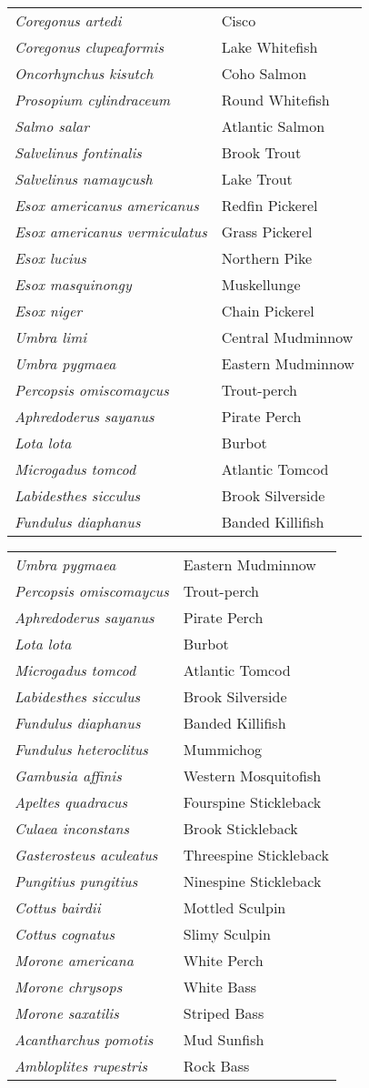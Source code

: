\documentclass[11pt]{article}
\begin{document}
\vspace{\baselineskip}

%
\textbf{\Student}

\begin{tabular}{@{}L{3in}L{3in}@{}}
\textit{Coregonus artedi} & Cisco\tabularnewline
\textit{Coregonus clupeaformis} & Lake Whitefish\tabularnewline
\textit{Oncorhynchus kisutch} & Coho Salmon\tabularnewline
\textit{Prosopium cylindraceum} & Round Whitefish\tabularnewline
\textit{Salmo salar} & Atlantic Salmon\tabularnewline
\textit{Salvelinus fontinalis} & Brook Trout\tabularnewline
\textit{Salvelinus namaycush} & Lake Trout\tabularnewline
\textit{Esox americanus americanus} & Redfin Pickerel\tabularnewline
\textit{Esox americanus vermiculatus} & Grass Pickerel\tabularnewline
\textit{Esox lucius} & Northern Pike\tabularnewline
\textit{Esox masquinongy} & Muskellunge\tabularnewline
\textit{Esox niger} & Chain Pickerel\tabularnewline
\textit{Umbra limi} & Central Mudminnow\tabularnewline
\textit{Umbra pygmaea} & Eastern Mudminnow\tabularnewline
\textit{Percopsis omiscomaycus}	& Trout-perch\tabularnewline
\textit{Aphredoderus sayanus} & Pirate Perch\tabularnewline
\textit{Lota lota} & Burbot\tabularnewline
\textit{Microgadus tomcod} & Atlantic Tomcod\tabularnewline
\textit{Labidesthes sicculus} & Brook Silverside\tabularnewline
\textit{Fundulus diaphanus} & Banded Killifish\tabularnewline
\end{tabular}

\newpage

\vspace{\baselineskip}

%
\textbf{\Student}

\begin{tabular}{@{}L{3in}L{3in}@{}}
\textit{Umbra pygmaea} & Eastern Mudminnow\tabularnewline
\textit{Percopsis omiscomaycus}	& Trout-perch\tabularnewline
\textit{Aphredoderus sayanus} & Pirate Perch\tabularnewline
\textit{Lota lota} & Burbot\tabularnewline
\textit{Microgadus tomcod} & Atlantic Tomcod\tabularnewline
\textit{Labidesthes sicculus} & Brook Silverside\tabularnewline
\textit{Fundulus diaphanus} & Banded Killifish\tabularnewline
\textit{Fundulus heteroclitus} & Mummichog\tabularnewline
\textit{Gambusia affinis} & Western Mosquitofish\tabularnewline
\textit{Apeltes quadracus} & Fourspine Stickleback\tabularnewline
\textit{Culaea inconstans} & Brook Stickleback\tabularnewline
\textit{Gasterosteus aculeatus} & Threespine Stickleback\tabularnewline
\textit{Pungitius pungitius} & Ninespine Stickleback\tabularnewline
\textit{Cottus bairdii} & Mottled Sculpin\tabularnewline
\textit{Cottus cognatus} & Slimy Sculpin\tabularnewline
\textit{Morone americana} & White Perch\tabularnewline
\textit{Morone chrysops} & White Bass\tabularnewline
\textit{Morone saxatilis} & Striped Bass\tabularnewline
\textit{Acantharchus pomotis} & Mud Sunfish\tabularnewline
\textit{Ambloplites rupestris} & Rock Bass\tabularnewline
\end{tabular}
\end{document}
